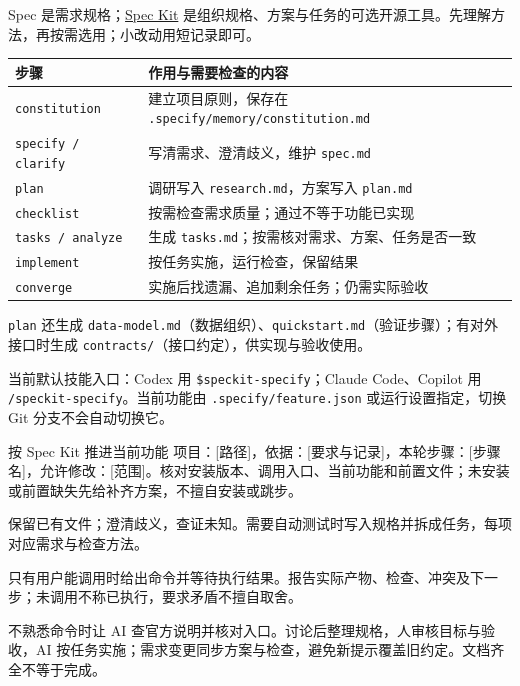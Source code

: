 Spec 是需求规格；\href{https://github.com/github/spec-kit}{Spec Kit} 是组织规格、方案与任务的可选开源工具。先理解方法，再按需选用；小改动用短记录即可。
\begin{tabularx}{\linewidth}{@{}L{39mm}Y@{}}
\toprule 步骤 & 作用与需要检查的内容\\\midrule
\texttt{constitution} & 建立项目原则，保存在 \texttt{.specify/memory/constitution.md}\\
\texttt{specify / clarify} & 写清需求、澄清歧义，维护 \texttt{spec.md}\\
\texttt{plan} & 调研写入 \texttt{research.md}，方案写入 \texttt{plan.md}\\
\texttt{checklist} & 按需检查需求质量；通过不等于功能已实现\\
\texttt{tasks / analyze} & 生成 \texttt{tasks.md}；按需核对需求、方案、任务是否一致\\
\texttt{implement} & 按任务实施，运行检查，保留结果\\
\texttt{converge} & 实施后找遗漏、追加剩余任务；仍需实际验收\\
\bottomrule\end{tabularx}

\texttt{plan} 还生成 \texttt{data-model.md}（数据组织）、\texttt{quickstart.md}（验证步骤）；有对外接口时生成 \texttt{contracts/}（接口约定），供实现与验收使用。

当前默认技能入口：Codex 用 \texttt{\$speckit-specify}；Claude Code、Copilot 用 \texttt{/speckit-specify}。当前功能由 \texttt{.specify/}\allowbreak\texttt{feature.json} 或运行设置指定，切换 Git 分支不会自动切换它。
\begin{prompt}{按 Spec Kit 推进当前功能}
项目：[路径]，依据：[要求与记录]，本轮步骤：[步骤名]，允许修改：[范围]。核对安装版本、调用入口、当前功能和前置文件；未安装或前置缺失先给补齐方案，不擅自安装或跳步。\par
保留已有文件；澄清歧义，查证未知。需要自动测试时写入规格并拆成任务，每项对应需求与检查方法。\par
只有用户能调用时给出命令并等待执行结果。报告实际产物、检查、冲突及下一步；未调用不称已执行，要求矛盾不擅自取舍。
\end{prompt}
不熟悉命令时让 AI 查官方说明并核对入口。讨论后整理规格，人审核目标与验收，AI 按任务实施；需求变更同步方案与检查，避免新提示覆盖旧约定。文档齐全不等于完成。
